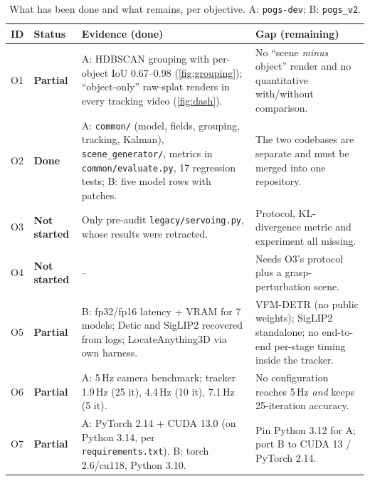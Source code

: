 \documentclass[10pt,a4paper]{article}
\newcommand{\done}{\textcolor{done}{\textbf{Done}}}
\newcommand{\stpart}{\textcolor{part}{\textbf{Partial}}}
\newcommand{\miss}{\textcolor{miss}{\textbf{Not started}}}
\begin{document}
\begin{table}[H]
\centering\small
\caption{What has been done and what remains, per objective. A: \texttt{pogs-dev}; B: \texttt{pogs\_v2}.}
\label{tab:status}
\begin{tabularx}{\linewidth}{@{}l l L L@{}}
\toprule
ID & Status & Evidence (done) & Gap (remaining) \\
\midrule
O1 & \stpart & A: HDBSCAN grouping with per-object IoU 0.67--0.98 (\cref{fig:grouping});
     ``object-only'' raw-splat renders in every tracking video (\cref{fig:dash}). &
     No ``scene \emph{minus} object'' render and no quantitative with/without comparison. \\
O2 & \done & A: \texttt{common/} (model, fields, grouping, tracking, Kalman),
     \texttt{scene\_generator/}, metrics in \texttt{common/evaluate.py}, 17 regression tests;
     B: five model rows with patches. & The two codebases are separate and must be merged into one repository. \\
O3 & \miss & Only pre-audit \texttt{legacy/servoing.py}, whose results were retracted. &
     Protocol, KL-divergence metric and experiment all missing. \\
O4 & \miss & -- & Needs O3's protocol plus a grasp-perturbation scene. \\
O5 & \stpart & B: fp32/fp16 latency + VRAM for 7 models; Detic and SigLIP2 recovered from logs;
     LocateAnything3D via own harness. & VFM-DETR (no public weights); SigLIP2 standalone; no end-to-end
     per-stage timing inside the tracker. \\
O6 & \stpart & A: 5\,Hz camera benchmark; tracker 1.9\,Hz (25 it), 4.4\,Hz (10 it), 7.1\,Hz (5 it). &
     No configuration reaches 5\,Hz \emph{and} keeps 25-iteration accuracy. \\
O7 & \stpart & A: PyTorch 2.14 + CUDA 13.0 (on Python 3.14, per \texttt{requirements.txt}). B: torch 2.6/cu118, Python 3.10. & Pin Python 3.12 for A; port B to CUDA 13 / PyTorch 2.14. \\
\bottomrule
\end{tabularx}
\end{table}
\end{document}
